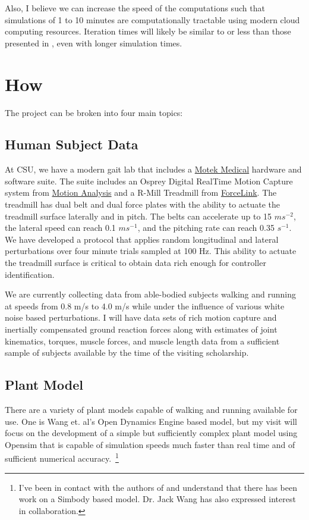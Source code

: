 \documentclass[11pt]{article}
\begin{document}
Also, I believe we can increase the speed of the computations
such that simulations of 1 to 10 minutes are computationally tractable using
modern cloud computing resources. Iteration times will likely be similar to or
less than those presented in \cite{Wang2012}, even with longer simulation
times.

\section*{How}

The project can be broken into four main topics:

\subsection*{Human Subject Data}

At CSU, we have a modern gait lab that includes a
\href{http://www.motekmedical.com}{Motek Medical} hardware and software suite.
The suite includes an Osprey Digital RealTime Motion Capture system from
\href{http://www.motionanalysis.com}{Motion Analysis} and a R-Mill Treadmill
from \href{http://www.forcelink.nl}{ForceLink}. The treadmill has dual belt and
dual force plates with the ability to actuate the treadmill surface laterally
and in pitch. The belts can accelerate up to 15 $ms^{-2}$, the lateral speed
can reach 0.1 $ms^{-1}$, and the pitching rate can reach 0.35 $s^{-1}$. We have
developed a protocol that applies random longitudinal and lateral perturbations
over four minute trials sampled at 100 Hz. This ability to actuate the
treadmill surface is critical to obtain data rich enough for controller
identification.


We are currently collecting data from able-bodied subjects walking and running
at speeds from 0.8 m/s to 4.0 m/s while under the influence of various white
noise based perturbations. I will have data sets of rich motion capture and
inertially compensated ground reaction forces along with estimates of joint
kinematics, torques, muscle forces, and muscle length data from a sufficient
sample of subjects available by the time of the visiting scholarship.

\subsection*{Plant Model}
There are a variety of plant models capable of walking and running available
for use. One is Wang et. al's Open Dynamics Engine based model, but my visit
will focus on the development of a simple but sufficiently complex plant model
using Opensim that is capable of simulation speeds much faster than real time
and of sufficient numerical accuracy.~\footnote{I've been in contact with the
  authors of \cite{Wang2012} and understand that there has been work on a
  Simbody based model. Dr. Jack Wang has also expressed interest in
collaboration.}
\end{document}
